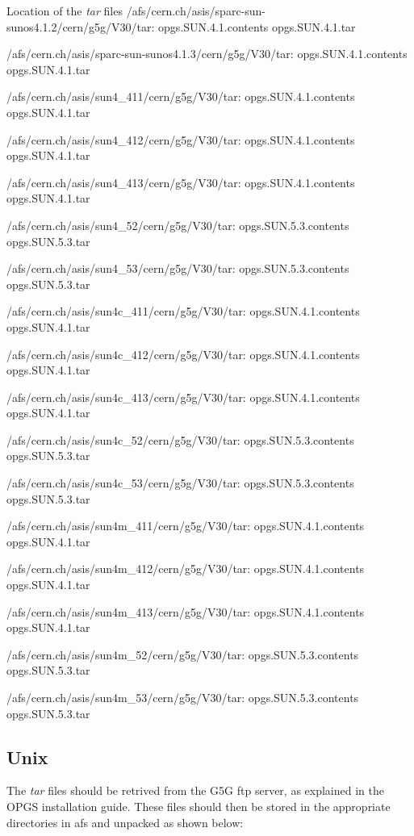 \begin{XMPt}{Location of the {\it tar} files}
/afs/cern.ch/asis/sparc-sun-sunos4.1.2/cern/g5g/V30/tar:
opgs.SUN.4.1.contents
opgs.SUN.4.1.tar

/afs/cern.ch/asis/sparc-sun-sunos4.1.3/cern/g5g/V30/tar:
opgs.SUN.4.1.contents
opgs.SUN.4.1.tar

/afs/cern.ch/asis/sun4_411/cern/g5g/V30/tar:
opgs.SUN.4.1.contents
opgs.SUN.4.1.tar

/afs/cern.ch/asis/sun4_412/cern/g5g/V30/tar:
opgs.SUN.4.1.contents
opgs.SUN.4.1.tar

/afs/cern.ch/asis/sun4_413/cern/g5g/V30/tar:
opgs.SUN.4.1.contents
opgs.SUN.4.1.tar

/afs/cern.ch/asis/sun4_52/cern/g5g/V30/tar:
opgs.SUN.5.3.contents
opgs.SUN.5.3.tar

/afs/cern.ch/asis/sun4_53/cern/g5g/V30/tar:
opgs.SUN.5.3.contents
opgs.SUN.5.3.tar

/afs/cern.ch/asis/sun4c_411/cern/g5g/V30/tar:
opgs.SUN.4.1.contents
opgs.SUN.4.1.tar

/afs/cern.ch/asis/sun4c_412/cern/g5g/V30/tar:
opgs.SUN.4.1.contents
opgs.SUN.4.1.tar

/afs/cern.ch/asis/sun4c_413/cern/g5g/V30/tar:
opgs.SUN.4.1.contents
opgs.SUN.4.1.tar

/afs/cern.ch/asis/sun4c_52/cern/g5g/V30/tar:
opgs.SUN.5.3.contents
opgs.SUN.5.3.tar

/afs/cern.ch/asis/sun4c_53/cern/g5g/V30/tar:
opgs.SUN.5.3.contents
opgs.SUN.5.3.tar

/afs/cern.ch/asis/sun4m_411/cern/g5g/V30/tar:
opgs.SUN.4.1.contents
opgs.SUN.4.1.tar

/afs/cern.ch/asis/sun4m_412/cern/g5g/V30/tar:
opgs.SUN.4.1.contents
opgs.SUN.4.1.tar

/afs/cern.ch/asis/sun4m_413/cern/g5g/V30/tar:
opgs.SUN.4.1.contents
opgs.SUN.4.1.tar

/afs/cern.ch/asis/sun4m_52/cern/g5g/V30/tar:
opgs.SUN.5.3.contents
opgs.SUN.5.3.tar

/afs/cern.ch/asis/sun4m_53/cern/g5g/V30/tar:
opgs.SUN.5.3.contents
opgs.SUN.5.3.tar

\end{XMPt}

\subsection{Unix}

The {\it tar} files should be retrived from the G5G ftp server,
as explained in the OPGS installation guide. These files should
then be stored in the appropriate directories in afs and unpacked
as shown below:

